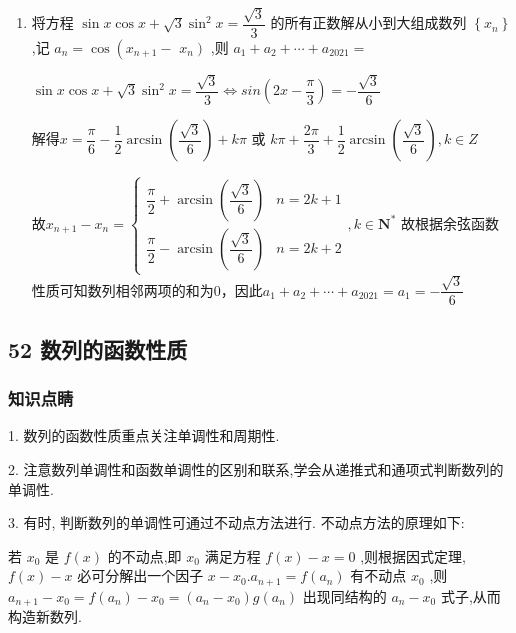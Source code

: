 \begin{enumerate}
\begin{jieda}
        所以 ${S}_{8} = \left( {-1}\right)  + \left( {-1}\right)  + \left( {-1}\right)  + 1 =  - 2$
    \end{jieda}
    \item 将方程 $\sin x\cos x + \sqrt{3}{\sin }^{2}x = \dfrac{\sqrt{3}}{3}$ 的所有正数解从小到大组成数列 $\left\{  {x}_{n}\right\}$ ,记 ${a}_{n} = \cos \left( {{x}_{n + 1} - }\right.$  $\left. {x}_{n}\right)$ ,则 ${a}_{1} + {a}_{2} + \cdots  + {a}_{2021} =$ 
    \begin{jieda}
        $\sin x\cos x + \sqrt{3}{\sin }^{2}x = \dfrac{\sqrt{3}}{3} \Longleftrightarrow sin\left(2x-\dfrac{\pi}{3}\right) = -\dfrac{\sqrt{3}}{6}$

        解得$x = \dfrac{\pi }{6} - \dfrac{1}{2}\arcsin\left( \dfrac{\sqrt{3}}{6}\right) + {k\pi }$ 或 ${k\pi } + \dfrac{2\pi }{3} + \dfrac{1}{2}\arcsin\left( \dfrac{\sqrt{3}}{6}\right),k \in  Z$

        故$x_{n+1} - x_n = \left\{\begin{array}{ll}
             \dfrac{\pi}{2} + \arcsin\left( \dfrac{\sqrt{3}}{6}\right) & n = 2k+1 \\
             \dfrac{\pi}{2} - \arcsin\left( \dfrac{\sqrt{3}}{6}\right) & n = 2k+2
        \end{array}\right., k \in \mathbf{N^*}$
        故根据余弦函数性质可知数列相邻两项的和为0，因此${a}_{1} + {a}_{2} + \cdots  + {a}_{2021} = a_1 = -\dfrac{\sqrt{3}}{6}$
    \end{jieda}
\end{enumerate}
\subsection*{52 数列的函数性质}

\subsubsection*{知识点睛}

1. 数列的函数性质重点关注单调性和周期性.

2. 注意数列单调性和函数单调性的区别和联系,学会从递推式和通项式判断数列的单调性.

3. 有时, 判断数列的单调性可通过不动点方法进行. 不动点方法的原理如下:

若 ${x}_{0}$ 是 $f\left( x\right)$ 的不动点,即 ${x}_{0}$ 满足方程 $f\left( x\right)  - x = 0$ ,则根据因式定理, $f\left( x\right)  - x$ 必可分解出一个因子 $x - {x}_{0}.{a}_{n + 1} = f\left( {a}_{n}\right)$ 有不动点 ${x}_{0}$ ,则 ${a}_{n + 1} - {x}_{0} = f\left( {a}_{n}\right)  - {x}_{0} = \left( {{a}_{n} - {x}_{0}}\right) g\left( {a}_{n}\right)$ 出现同结构的 ${a}_{n} - {x}_{0}$ 式子,从而构造新数列.


